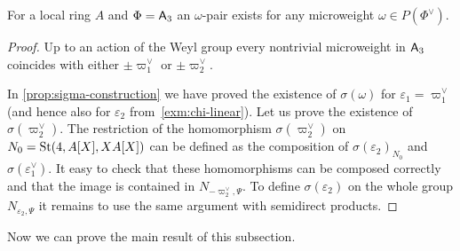 \begin{cor} \label{cor:a3-microweight}
    For a local ring $A$ and $\Phi = \mathsf{A}_3$ an $\omega$-pair exists for any microweight $\omega \in P(\Phi^\vee)$.
\end{cor}
\begin{proof}
    Up to an action of the Weyl group every nontrivial microweight in $\mathsf{A}_3$ coincides with either
    $\pm\varpi_1^\vee$ or $\pm\varpi_2^\vee$.

    In \cref{prop:sigma-construction} we have proved the existence of $\sigma(\omega)$ for $\varepsilon_1 = \varpi_1^\vee$ (and hence also for $\varepsilon_2$ from~\cref{exm:chi-linear}).
    Let us prove the existence of $\sigma(\varpi_2^\vee)$.
    The restriction of the homomorphism $\sigma(\varpi_2^\vee)$ on $N_0 = \operatorname{St}(4, A[X], XA[X])$ can be defined as the composition of
     $\sigma(\varepsilon_2)_{N_0}$ and $\sigma(\varepsilon_1^\vee)$.
    It easy to check that these homomorphisms can be composed correctly and that the image is contained in $N_{-\varpi_2^\vee, \Psi}$.
    To define $\sigma(\varepsilon_2)$ on the whole group $N_{\varepsilon_2, \Psi}$ it remains to use the same argument with semidirect products.
\end{proof}

Now we can prove the main result of this subsection.

